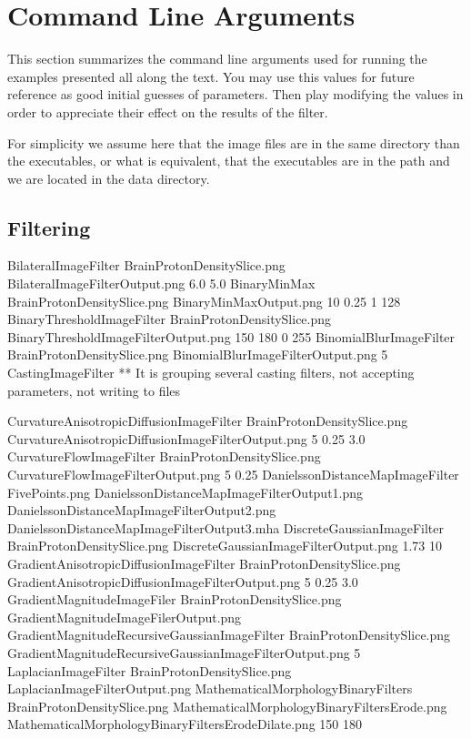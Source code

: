 \section{Command Line Arguments}

This section summarizes the command line arguments used for running the
examples presented all along the text. You may use this values for future
reference as good initial guesses of parameters. Then play modifying the values
in order to appreciate their effect on the results of the filter.

For simplicity we assume here that the image files are in the same directory
than the executables, or what is equivalent, that the executables are in the
path and we are located in the data directory.

\subsection{Filtering}


BilateralImageFilter             BrainProtonDensitySlice.png  BilateralImageFilterOutput.png        6.0    5.0
BinaryMinMax                     BrainProtonDensitySlice.png  BinaryMinMaxOutput.png                10      0.25  1  128
BinaryThresholdImageFilter       BrainProtonDensitySlice.png  BinaryThresholdImageFilterOutput.png  150 180 0 255
BinomialBlurImageFilter          BrainProtonDensitySlice.png  BinomialBlurImageFilterOutput.png     5
CastingImageFilter               ** It is grouping several casting filters, not accepting parameters, not writing to files

CurvatureAnisotropicDiffusionImageFilter  BrainProtonDensitySlice.png  CurvatureAnisotropicDiffusionImageFilterOutput.png  5  0.25  3.0
CurvatureFlowImageFilter         BrainProtonDensitySlice.png  CurvatureFlowImageFilterOutput.png   5  0.25
DanielssonDistanceMapImageFilter FivePoints.png DanielssonDistanceMapImageFilterOutput1.png DanielssonDistanceMapImageFilterOutput2.png DanielssonDistanceMapImageFilterOutput3.mha
DiscreteGaussianImageFilter      BrainProtonDensitySlice.png  DiscreteGaussianImageFilterOutput.png  1.73  10
GradientAnisotropicDiffusionImageFilter  BrainProtonDensitySlice.png GradientAnisotropicDiffusionImageFilterOutput.png   5    0.25   3.0
GradientMagnitudeImageFiler      BrainProtonDensitySlice.png  GradientMagnitudeImageFilerOutput.png
GradientMagnitudeRecursiveGaussianImageFilter  BrainProtonDensitySlice.png GradientMagnitudeRecursiveGaussianImageFilterOutput.png  5
LaplacianImageFilter             BrainProtonDensitySlice.png  LaplacianImageFilterOutput.png 
MathematicalMorphologyBinaryFilters BrainProtonDensitySlice.png MathematicalMorphologyBinaryFiltersErode.png MathematicalMorphologyBinaryFiltersErodeDilate.png 150 180


